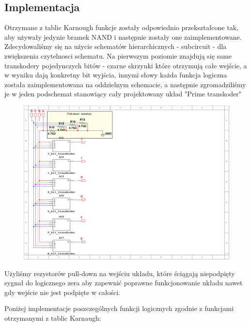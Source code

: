 \documentclass[a4paper]{article}
\begin{document}
\subsection{Implementacja}
Otrzymane z tablic Karnough funkcje zostały odpowiednio przekształcone tak,
 aby używały jedynie bramek NAND i następnie zostały one zaimplementowane. Zdecydowaliśmy się 
 na użycie schematów hierarchicznych - subcircuit - dla zwiększenia czytelnosci schematu. 
 Na pierwszym poziomie znajdują się same transkodery pojedynczych bitów - czarne skrzynki które otrzymują 
 całe wejście, a w wyniku dają konkretny bit wyjścia, innymi słowy każda funkcja logiczna została zaimplementowana
 na oddzielnym schemacie, a następnie zgromadziliśmy je w jeden podschemat stanowiący cały projektowany układ "Prime transkoder"
\begin{figure}[H]
  \centering
  \includegraphics[width=\textwidth]{prime_transkoder.png}
  \label{Podschemat najwyższego rzędu, gromadzący w sobie podschematy właściwych funkcji logicznych}
\end{figure}

Użyliśmy rezystorów pull-down na wejściu układu, które ściągają niepodpięty sygnał do logicznego zera aby 
zapewnić poprawne funkcjonowanie układu nawet gdy wejście nie jest podpięte w całości.

Poniżej implementacje poszczególnych funkcji logicznych zgodnie z funkcjami otrzymanymi z tablic Karnaugh:
\end{document}
